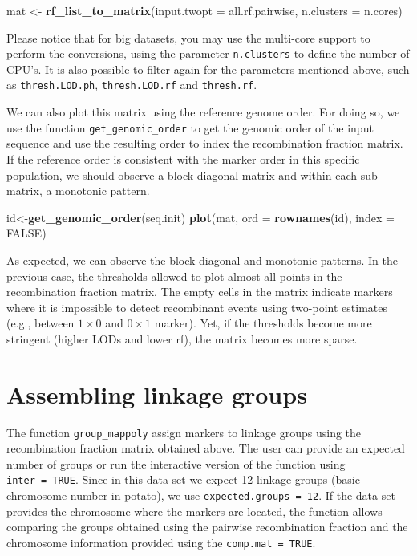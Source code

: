 \documentclass[
]{article}
\newenvironment{Shaded}{}{}
\newcommand{\DataTypeTok}[1]{\textcolor[rgb]{0.56,0.13,0.00}{#1}}
\newcommand{\KeywordTok}[1]{\textcolor[rgb]{0.00,0.44,0.13}{\textbf{#1}}}
\newcommand{\NormalTok}[1]{#1}
\newcommand{\OtherTok}[1]{\textcolor[rgb]{0.00,0.44,0.13}{#1}}
\newcommand{\StringTok}[1]{\textcolor[rgb]{0.25,0.44,0.63}{#1}}
\begin{document}
\begin{Shaded}
\begin{Highlighting}[]
\NormalTok{mat <-}\StringTok{ }\KeywordTok{rf_list_to_matrix}\NormalTok{(}\DataTypeTok{input.twopt =}\NormalTok{ all.rf.pairwise, }\DataTypeTok{n.clusters =}\NormalTok{ n.cores)}
\end{Highlighting}
\end{Shaded}

Please notice that for big datasets, you may use the multi-core support
to perform the conversions, using the parameter \texttt{n.clusters} to
define the number of CPU's. It is also possible to filter again for the
parameters mentioned above, such as \texttt{thresh.LOD.ph},
\texttt{thresh.LOD.rf} and \texttt{thresh.rf}.

We can also plot this matrix using the reference genome order. For doing
so, we use the function \texttt{get\_genomic\_order} to get the genomic
order of the input sequence and use the resulting order to index the
recombination fraction matrix. If the reference order is consistent with
the marker order in this specific population, we should observe a
block-diagonal matrix and within each sub-matrix, a monotonic pattern.

\begin{Shaded}
\begin{Highlighting}[]
\NormalTok{id<-}\KeywordTok{get_genomic_order}\NormalTok{(seq.init)}
\KeywordTok{plot}\NormalTok{(mat, }\DataTypeTok{ord =} \KeywordTok{rownames}\NormalTok{(id), }\DataTypeTok{index =} \OtherTok{FALSE}\NormalTok{)}
\end{Highlighting}
\end{Shaded}

As expected, we can observe the block-diagonal and monotonic patterns.
In the previous case, the thresholds allowed to plot almost all points
in the recombination fraction matrix. The empty cells in the matrix
indicate markers where it is impossible to detect recombinant events
using two-point estimates (e.g., between \(1 \times 0\) and
\(0 \times 1\) marker). Yet, if the thresholds become more stringent
(higher LODs and lower rf), the matrix becomes more sparse.

\hypertarget{assembling-linkage-groups}{%
\section{Assembling linkage groups}\label{assembling-linkage-groups}}

The function \texttt{group\_mappoly} assign markers to linkage groups
using the recombination fraction matrix obtained above. The user can
provide an expected number of groups or run the interactive version of
the function using \texttt{inter\ =\ TRUE}. Since in this data set we
expect 12 linkage groups (basic chromosome number in potato), we use
\texttt{expected.groups\ =\ 12}. If the data set provides the chromosome
where the markers are located, the function allows comparing the groups
obtained using the pairwise recombination fraction and the chromosome
information provided using the \texttt{comp.mat\ =\ TRUE}.
\end{document}
